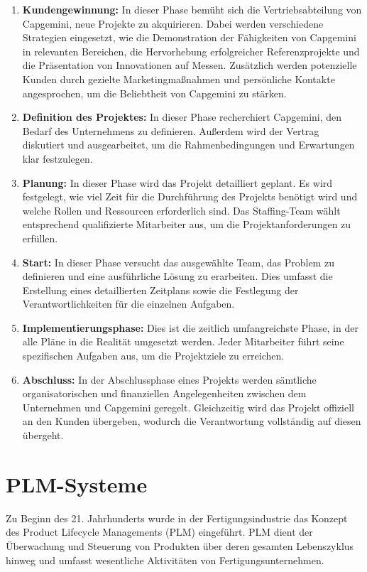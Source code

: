 \begin{enumerate}
	\item \textbf{Kundengewinnung:} In dieser Phase bemüht sich die Vertriebsabteilung von 		Capgemini, neue Projekte zu akquirieren. Dabei werden verschiedene Strategien eingesetzt, wie die Demonstration der Fähigkeiten von Capgemini in relevanten Bereichen, die Hervorhebung erfolgreicher Referenzprojekte und die Präsentation von Innovationen auf Messen. Zusätzlich werden potenzielle Kunden durch gezielte Marketingmaßnahmen und persönliche Kontakte angesprochen, um die Beliebtheit von Capgemini zu stärken.
	\item \textbf{Definition des Projektes:} In dieser Phase recherchiert Capgemini, den Bedarf des Unternehmens zu definieren. Außerdem wird der Vertrag diskutiert und ausgearbeitet, um die Rahmenbedingungen und Erwartungen klar festzulegen.
	
	\item \textbf{Planung:} In dieser Phase wird das Projekt detailliert geplant. Es wird 
	festgelegt, wie viel Zeit für die Durchführung des Projekts benötigt wird und welche Rollen und Ressourcen erforderlich sind. Das Staffing-Team wählt entsprechend qualifizierte Mitarbeiter aus, um die Projektanforderungen zu erfüllen.
	\item \textbf{Start:} In dieser Phase versucht das ausgewählte Team, das Problem zu definieren und eine ausführliche Lösung zu erarbeiten. Dies umfasst die Erstellung eines detaillierten Zeitplans sowie die Festlegung der Verantwortlichkeiten für die einzelnen Aufgaben.
	\item \textbf{Implementierungsphase:} Dies ist die zeitlich umfangreichste Phase, in der alle Pläne in die Realität umgesetzt werden. Jeder Mitarbeiter führt seine spezifischen Aufgaben aus, um die Projektziele zu erreichen.
	\item \textbf{Abschluss:} In der Abschlussphase eines Projekts werden sämtliche organisatorischen und finanziellen Angelegenheiten zwischen dem Unternehmen und Capgemini geregelt. Gleichzeitig wird das Projekt offiziell an den Kunden übergeben, wodurch die Verantwortung vollständig auf diesen übergeht.
\end{enumerate}
\section{PLM-Systeme}
Zu Beginn des 21. Jahrhunderts wurde in der Fertigungsindustrie das Konzept des Product Lifecycle Managements (PLM) eingeführt. PLM dient der Überwachung und Steuerung von Produkten über deren gesamten Lebenszyklus hinweg und umfasst wesentliche Aktivitäten von Fertigungsunternehmen\cite{stark2011product}.
